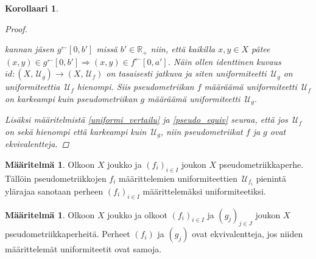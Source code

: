 \documentclass[12pt,a4paper,leqno]{report}
\newcommand{\R}{\mathbb{R}}
\newcommand{\U}{\,\mathcal{U}}
\theoremstyle{plain}
\newtheorem{kor}[equation]{Korollaari}
\theoremstyle{definition}
\newtheorem{maar}[equation]{Määritelmä}
\newtheorem{esim}[equation]{Esimerkki}
\theoremstyle{remark}
\begin{document}
\begin{kor}
\begin{proof}
\begin{enumerate}
kannan jäsen $g^{\leftarrow}[0,b']$ missä $b'\in\R_+$ niin, 
että kaikilla $x,y\in X$ pätee $(x,y)\in g^{\leftarrow}[0,b']\Rightarrow (x,y)\in f^{\leftarrow}[0,a']$. 
Näin ollen identtinen kuvaus $id\colon (X,\U_g)\rightarrow (X,\U_f)$ on 
tasaisesti jatkuva ja siten uniformiteetti $\U_g$ on uniformiteettia $\U_f$ hienompi. 
Siis pseudometriikan $f$ määräämä uniformiteetti 
$\U_f$ 
on karkeampi kuin pseudometriikan $g$ määräämä uniformiteetti $\U_g$.
\end{enumerate}
Lisäksi 
määritelmistä \ref{uniformi_vertailu} ja \ref{pseudo_equiv} seuraa, että jos $\U_f$ on sekä hienompi että karkeampi kuin $\U_g$, niin pseudometriikat $f$ ja $g$ ovat ekvivalentteja.
\end{proof}
\end{kor}
\begin{maar}
Olkoon $X$ joukko ja $(f_i)_{i\in I} $ joukon $X$ pseudometriikkaperhe. 
Tällöin pseudometriikkojen $f_i$ määrittelemien uniformiteettien $\U_{f_i}$ pienintä ylärajaa sanotaan perheen $(f_i)_{i\in I}$ määrittelemäksi uniformiteetiksi. 
\end{maar}
\begin{maar}
Olkoon $X$ joukko ja olkoot $(f_i)_{i\in I} $ ja $(g_j)_{j\in J} $ joukon $X$ pseudometriikkaperheitä. 
Perheet $(f_i)$ ja $(g_j) $ ovat ekvivalentteja, jos niiden määrittelemät uniformiteetit ovat samoja.
\end{maar}
\end{document}
